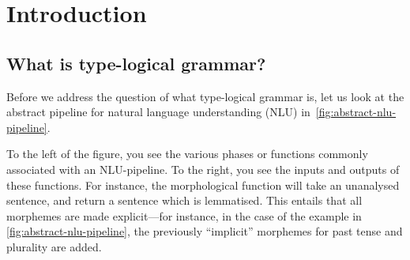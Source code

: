 \section{Introduction}
\label{sec:introduction}

\subsection{What is type-logical grammar?}
\label{sec:what-is-type-logical-grammar}

Before we address the question of what type-logical grammar is, let us
look at the abstract pipeline for natural language understanding (NLU)
in~\autoref{fig:abstract-nlu-pipeline}.



To the left of the figure, you see the various phases or functions
commonly associated with an NLU-pipeline. To the right, you see the
inputs and outputs of these functions.
For instance, the morphological function will take an unanalysed
sentence, and return a sentence which is lemmatised. This entails that
all morphemes are made explicit---for instance, in the case of the
example in \autoref{fig:abstract-nlu-pipeline}, the previously
``implicit'' morphemes for past tense and plurality are added.

